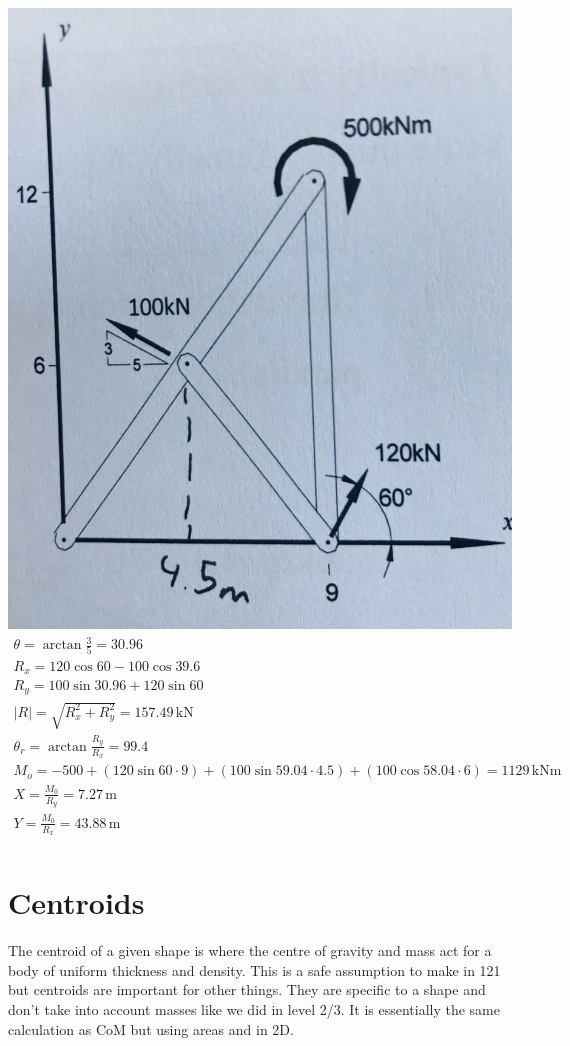 \documentclass[a4paper, 12pt]{article}
\newcommand{\unit}[1]{\ensuremath{\, \mathrm{#1}}}
\begin{document}
\includegraphics[scale=0.04]{4}
\begin{gather*}
    \theta = \arctan{\frac{3}{5}} = 30.96 \\
    R_x = 120\cos{60} - 100\cos{39.6} \\
    R_y = 100\sin{30.96} + 120\sin{60} \\
    |R| = \sqrt{R_x^2+R_y^2} = 157.49\unit{kN} \\
    \theta_r = \arctan{\frac{R_y}{R_x}} = 99.4 \\
    M_o = -500 + (120\sin{60}\cdot9) + (100\sin{59.04}\cdot4.5) + (100\cos{58.04}\cdot6) = 1129\unit{kNm} \\
    X = \frac{M_0}{R_y} = 7.27\unit{m} \\
    Y = \frac{M_0}{R_x} = 43.88\unit{m} \\
\end{gather*}
\newpage

\section{Centroids}
The centroid of a given shape is where the centre of gravity and mass act for a body of uniform thickness and density.
This is a safe assumption to make in 121 but centroids are important for other things. 
They are specific to a shape and don't take into account masses like we did in level 2/3. 
It is essentially the same calculation as CoM but using areas and in 2D. 
\end{document}
